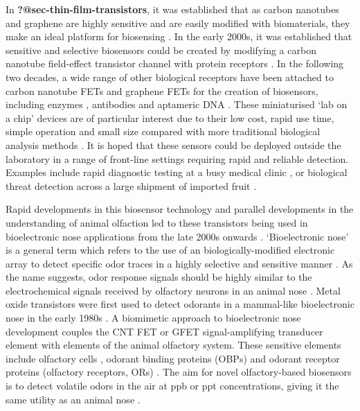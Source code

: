 \documentclass[
  a4paper,
]{scrbook}
\begin{document}
In \textbf{?@sec-thin-film-transistors}, it was established that as
carbon nanotubes and graphene are highly sensitive and are easily
modified with biomaterials, they make an ideal platform for biosensing
\autocite{Kauffman2008,Ohno2010}. In the early 2000s, it was established
that sensitive and selective biosensors could be created by modifying a
carbon nanotube field-effect transistor channel with protein receptors
\autocite{Chen2003,Kauffman2008}. In the following two decades, a wide
range of other biological receptors have been attached to carbon
nanotube FETs and graphene FETs for the creation of biosensors,
including enzymes \autocite{Lee2009,Zhang2015a,Dudina2019}, antibodies
\autocite{Kim2008,Jin2015,Tsang2019} and aptameric DNA
\autocite{Maehashi2007,Gao2016,Nguyen2021}. These miniaturised `lab on a
chip' devices are of particular interest due to their low cost, rapid
use time, simple operation and small size compared with more traditional
biological analysis methods \autocite{Kauffman2008}. It is hoped that
these sensors could be deployed outside the laboratory in a range of
front-line settings requiring rapid and reliable detection. Examples
include rapid diagnostic testing at a busy medical clinic
\autocite{Lim2014}, or biological threat detection across a large
shipment of imported fruit \autocite{B3,Queensland}.

Rapid developments in this biosensor technology and parallel
developments in the understanding of animal olfaction led to these
transistors being used in bioelectronic nose applications from the late
2000s onwards \autocite{Yoon2009,Jin2012,Lee2012b,Park2012}.
`Bioelectronic nose' is a general term which refers to the use of an
biologically-modified electronic array to detect specific odor traces in
a highly selective and sensitive manner \autocite{Dung2018}. As the name
suggests, odor response signals should be highly similar to the
electrochemical signals received by olfactory neurons in an animal nose
\autocite{Dung2018}. Metal oxide transistors were first used to detect
odorants in a mammal-like bioelectronic nose in the early 1980s
\autocite{Persaud1982}. A biomimetic approach to bioelectronic nose
development couples the CNT FET or GFET signal-amplifying transducer
element with elements of the animal olfactory system. These sensitive
elements include olfactory cells \autocite{Wang2007}, odorant binding
proteins (OBPs) \autocite{Larisika2015,Kotlowski2018} and odorant
receptor proteins (olfactory receptors, ORs)
\autocite{Yang2018,Murugathas2020}. The aim for novel olfactory-based
biosensors is to detect volatile odors in the air at ppb or ppt
concentrations, giving it the same utility as an animal nose
\autocite{Dung2018}.
\end{document}
